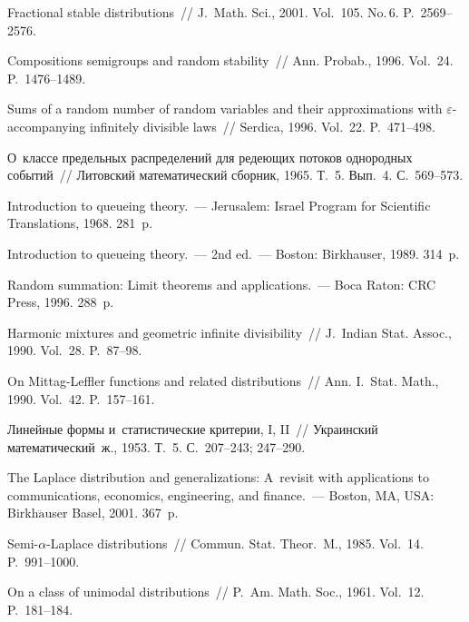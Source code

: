 \begin{multicols}{2}
{{\begin{thebibliography}{99}
Fractional stable distributions~// J.~Math. Sci., 2001. Vol.~105. No.\,6. P.~2569--2576.

 Compositions semigroups and random stability~//
Ann. Probab., 1996. Vol.~24. P.~1476--1489.

 Sums of a random number of random
variables and their approximations with $\varepsilon$-accompanying
infinitely divisible laws~// Serdica, 1996. Vol.~22. P.~471--498.

 О~классе предельных распределений для редеющих
потоков однородных событий~// Литовский математический сборник,
1965. Т.~5. Вып.~4. С.~569--573.

 Introduction to queueing
theory.~--- Jerusalem: Israel Program for Scientific Translations, 1968.
281~p.

 Introduction to queueing
theory.~--- 2nd ed.~--- Boston: Birkhauser, 1989. 314~p.

 Random summation: Limit
theorems and applications.~--- Boca Raton: CRC Press, 1996. 288~p.

 Harmonic mixtures and geometric infinite
divisibility~// J.~Indian Stat. Assoc., 1990.
Vol.~28. P.~87--98.

 On Mittag-Leffler functions and related
distributions~// Ann.  I.~Stat. Math.,
1990. Vol.~42. P.~157--161.

 Линейные формы и~статистические критерии, I, II~// 
Украинский математический~ж., 1953. Т.~5. С.~207--243; 247--290.

 The Laplace
distribution and generalizations: A~revisit with applications to
communications, economics, engineering, and finance.~--- Boston, MA, USA: 
Birkh$\ddot{\mbox{a}}$user Basel, 2001.
367~p.

 Semi-$\alpha$-Laplace distributions~//
Commun. Stat. Theor.~M., 1985. Vol.~14. P.~991--1000.

 On a class of unimodal distributions~// P.~Am. Math. Soc., 
1961. Vol.~12. P.~181--184.


\end{thebibliography}}}
\end{multicols}
